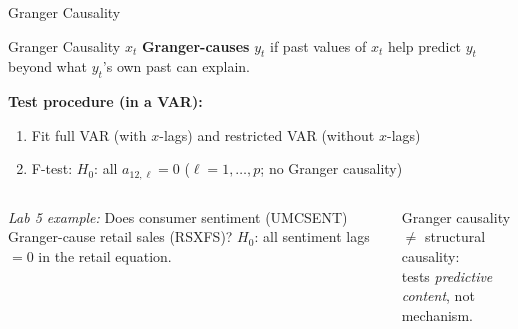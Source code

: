 \documentclass[aspectratio=169, 11pt]{beamer}
\begin{document}
\begin{frame}{Granger Causality}
  \begin{definitionbox}{Granger Causality}
    {\small $x_t$ \textbf{Granger-causes} $y_t$ if past values of $x_t$
    help predict $y_t$ beyond what $y_t$'s own past can explain.
    }
  \end{definitionbox}
  \textbf{Test procedure (in a VAR):}
  \begin{enumerate}\small
    \item Fit full VAR (with $x$-lags) and restricted VAR (without $x$-lags)
    \item F-test: $H_0$: all $a_{12,\ell} = 0$
          ($\ell = 1,\ldots,p$; no Granger causality)
  \end{enumerate}
  \begin{columns}[T]
      \textit{Lab 5 example:} Does consumer sentiment (UMCSENT)
      Granger-cause retail sales (RSXFS)?
      $H_0$: all sentiment lags $= 0$ in the retail equation.
      \begin{warningbox}
        {\small Granger causality $\neq$ structural causality:\\
        tests \emph{predictive content}, not mechanism.}
      \end{warningbox}
  \end{columns}
\end{frame}
\end{document}
